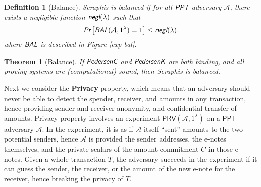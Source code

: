 \documentclass{article}
\newtheorem{definition}{Definition}[section]
\newtheorem{theorem}{Theorem}[section]
\begin{document}
\begin{definition}[Balance]
Seraphis is balanced if for all $\emph{\textsf{PPT}}$ adversary $\mathcal{A}$, there exists a negligible function $\emph{\textsf{negl}}(\lambda)$ such that
\begin{align*}
\emph{\textsf{Pr}}
\left[
\emph{\textsf{BAL}}(\mathcal{A}, 1^{\lambda})=1
\right]
\le \emph{\textsf{negl}}(\lambda).
\end{align*}
where $\emph{\textsf{BAL}}$ is described in Figure \ref{exp-bal}.
\end{definition}
\begin{theorem}[Balance]\label{thm-bal}
If $\emph{\textsf{PedersenC}}$ and $\emph{\textsf{PedersenK}}$ are both binding, and all proving systems are (computational) sound, then Seraphis is balanced.  
\end{theorem}
Next we consider the \textbf{Privacy} property, which means that an adversary should never be able to detect the spender, receiver, and amounts in any transaction, hence providing sender and receiver anonymity, and confidential transfer of amounts. Privacy property involves an experiment $\textsf{PRV}(\mathcal{A}, 1^{\lambda})$ on a $\textsf{PPT}$ adversary $\mathcal{A}$. In the experiment, it is as if $\mathcal{A}$ itself ``sent'' amounts to the two potential senders, hence $\mathcal{A}$ is provided the sender addresses, the e-notes themselves, and the private scalars of the amount commitment $C$ in those e-notes. Given a whole transaction $T$, the adversary succeeds in the experiment if it can guess the sender, the receiver, or the amount of the new e-note for the receiver, hence breaking the privacy of $T$.
\end{document}
